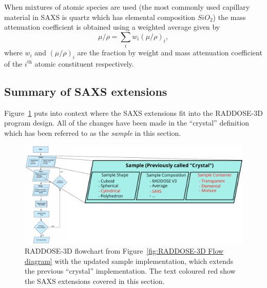 When mixtures of atomic species are used (the most commonly used capillary material in SAXS is quartz which has elemental composition $SiO_2$) the mass attenuation coefficient is obtained using a weighted average given by
\begin{equation}
    \mu/\rho = \sum_i w_i (\mu/\rho)_i,
\end{equation}
where $w_i$ and $(\mu/\rho)_i$ are the fraction by weight and mass attenuation coefficient of the $i^{\text{th}}$ atomic constituent respectively.

\subsection{Summary of SAXS extensions}
\label{sub:Summary of SAXS extensions}
Figure~\ref{fig:Updated RADDOSE-3D Flow diagram} puts into context where the SAXS extensions fit into the RADDOSE-3D program design.
All of the changes have been made in the ``crystal'' definition which has been referred to as the \textit{sample} in this section.
\begin{figure}
    \centering
    \includegraphics[width=1\textwidth]{figures/saxs/Sample_definitions.pdf}
    \caption[Updated flow diagram illustrating the structure of the RADDOSE-3D code with the SAXS extensions.]{RADDOSE-3D flowchart from Figure~\ref{fig:RADDOSE-3D Flow diagram} with the updated sample implementation, which extends the previous ``crystal'' implementation.
    The text coloured red show the SAXS extensions covered in this section.}
    \label{fig:Updated RADDOSE-3D Flow diagram}
\end{figure}

